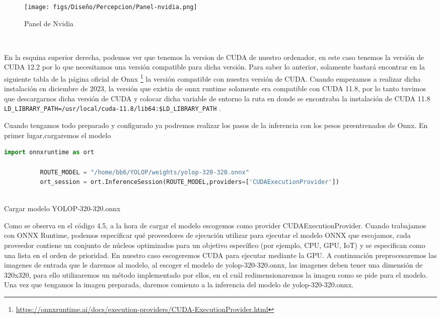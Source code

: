       \begin{figure} [H]
        \begin{center}
          \texttt{[image: figs/Diseño/Percepcion/Panel-nvidia.png]}
        \end{center}
        \caption{Panel de Nvidia}
        \label{fig:Nvidia}
      \end{figure}\

      En la esquina superior derecha, podemos ver que tenemos la version de CUDA de nuestro ordenador, en este caso tenemos la versión de CUDA 12.2 por lo que necesitamos una versión compatible
      para dicha versión. Para saber lo anterior, solamente bastará encontrar en la siguiente tabla de la página oficial de Onnx \footnote{\url{https://onnxruntime.ai/docs/execution-providers/CUDA-ExecutionProvider.html}} la versión compatible con nuestra versión de CUDA. \newline
      Cuando empezamos a realizar dicha instalación en diciembre de 2023, la versión que existia de onnx runtime solamente era compatible con CUDA 11.8, por lo tanto tuvimos que descargarnos 
      dicha versión de CUDA y colocar dicha variable de entorno la ruta en donde se encontraba la instalación de CUDA 11.8 \texttt{LD\_LIBRARY\_PATH=/usr/local/cuda-11.8/lib64:\$LD\_LIBRARY\_PATH} \break. 

      Cuando tengamos todo preparado y configurado ya podremos realizar los pasos de la inferencia con los pesos preentrenados de Onnx. En primer lugar,cargaremos el modelo
      
      \begin{code}[h]
        \begin{lstlisting}[language=Python]
          import onnxruntime as ort

          ROUTE_MODEL = "/home/bb6/YOLOP/weights/yolop-320-320.onnx"
          ort_session = ort.InferenceSession(ROUTE_MODEL,providers=['CUDAExecutionProvider'])
      
        \end{lstlisting}
        \caption[Cargar modelo]{Cargar modelo YOLOP-320-320.onnx}
        \label{cod:codejemplo}
        \end{code}  

        Como se observa en el código 4.5, a la hora de cargar el modelo escogemos como provider CUDAExecutionProvider. Cuando trabajamos con ONNX Runtime, 
        podemos especificar qué proveedores de ejecución utilizar para ejecutar el modelo ONNX que escojamos, cada proveedor contiene un conjunto de núcleos optimizados para un objetivo específico (por ejemplo, CPU, GPU, IoT) y 
        se especifican como una lista en el orden de prioridad. En nuestro caso escogeremos CUDA para ejecutar mediante la GPU. 
        \newline
        A continuación preprocesaremos las imagenes de entrada que le daremos al modelo, al escoger el modelo de yolop-320-320.onnx, las imagenes deben tener una dimensión de 320x320, para ello
        utilizaremos un método implementado por ellos, en el cuál redimensionaremos la imagen como se pide para el modelo. 
        Una vez que tengamos la imagen preparada, daremos comienzo a la inferencia del modelo de yolop-320-320.onnx. 
        \newpage

